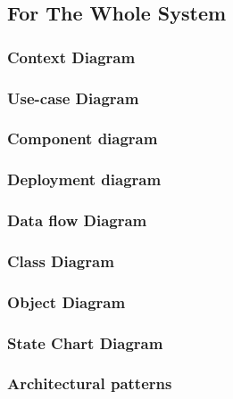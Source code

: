 \documentclass{article}
\begin{document}
	\newpage\subsection{For The Whole System}
	\subsubsection{Context Diagram}	
	\subsubsection{Use-case Diagram}
	\subsubsection{Component diagram}
	\subsubsection{Deployment diagram}
	\subsubsection{Data flow Diagram}		
	\subsubsection{Class Diagram}
	\subsubsection{Object Diagram}		
	\subsubsection{State Chart Diagram}
	\subsubsection{Architectural patterns}


	\newpage
	
	
\end{document}
